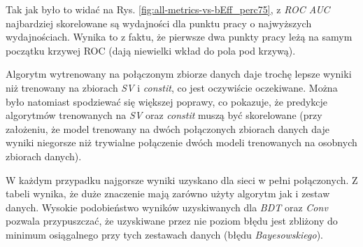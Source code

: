 Tak jak było to widać na Rys. \ref{fig:all-metrics-vs-bEff_perc75}, z \textit{ROC AUC} najbardziej skorelowane są wydajności dla punktu pracy o najwyższych wydajnościach. Wynika to z faktu, że pierwsze dwa punkty pracy leżą na samym początku krzywej ROC (dają niewielki wkład do pola pod krzywą).

Algorytm wytrenowany na połączonym zbiorze danych daje trochę lepsze wyniki niż trenowany na zbiorach \textit{SV} i \textit{constit}, co jest oczywiście oczekiwane. Można było natomiast spodziewać się większej poprawy, co pokazuje, że predykcje algorytmów trenowanych na \textit{SV} oraz \textit{constit} muszą być skorelowane (przy założeniu, że model trenowany na dwóch połączonych zbiorach danych daje wyniki niegorsze niż trywialne połączenie dwóch modeli trenowanych na osobnych zbiorach danych).

W każdym przypadku najgorsze wyniki uzyskano dla sieci w pełni połączonych.
Z tabeli wynika, że duże znaczenie mają zarówno użyty algorytm jak i zestaw danych.
Wysokie podobieństwo wyników uzyskiwanych dla \textit{BDT} oraz \textit{Conv} pozwala przypuszczać, że uzyskiwane przez nie poziom błędu jest zbliżony do minimum osiągalnego przy tych zestawach danych (błędu \textit{Bayesowskiego}).



